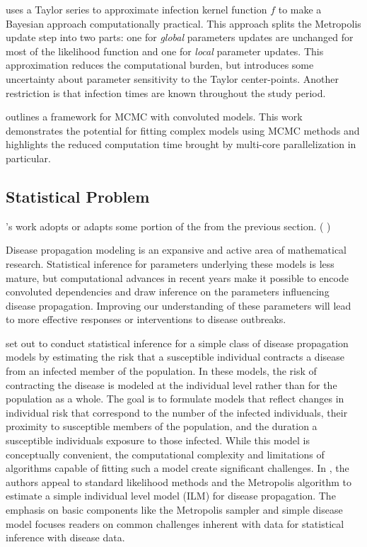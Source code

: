 \documentclass{uwstat572}
\newcommand{\vmcomment}[1]{({\color{blue}{VM's comment:}} \textbf{\color{blue}{#1}})}
\begin{document}
\cite{Deardon} uses a Taylor series to approximate infection kernel function $f$ to make a Bayesian approach computationally practical. 
This approach splits the Metropolis update step into two parts: one for \textit{global} parameters updates are unchanged for most of the likelihood function and one for \textit{local} parameter updates. 
This approximation reduces the computational burden, but introduces some uncertainty about parameter sensitivity to the Taylor center-points. 
Another restriction is that infection times are known throughout the study period. 

\cite{Jewell} outlines a framework for MCMC with convoluted models.
This work demonstrates the potential for fitting complex models using MCMC methods and highlights the reduced computation time brought by multi-core parallelization in particular.  

\subsection{Statistical Problem}

\cite{Brown}'s work adopts or adapts some portion of the from the previous section. 
\vmcomment{This a very vague sentence}

Disease propagation modeling is an expansive and active area of mathematical research.
Statistical inference for parameters underlying these models is less mature, but computational advances in recent years make it possible to encode convoluted dependencies and draw inference on the parameters influencing disease propagation. 
Improving our understanding of these parameters will lead to more effective responses or interventions to disease outbreaks. 

\citet{Brown} set out to conduct statistical inference for a simple class of disease propagation models by estimating the risk that a susceptible individual contracts a disease from an infected member of the population. 
In these models, the risk of contracting the disease is modeled at the individual level rather than for the population as a whole. 
The goal is to formulate models that reflect changes in individual risk that correspond to the number of the infected individuals, their proximity to susceptible members of the population, and the duration a susceptible individuals  exposure to those infected. 
While this model is conceptually convenient, the computational complexity and limitations of algorithms capable of fitting such a model create significant challenges.
In \citet{Brown}, the authors appeal to standard likelihood methods and the Metropolis algorithm to estimate a simple individual level model (ILM) for disease propagation.
The emphasis on basic components like the Metropolis sampler and simple disease model focuses readers on common challenges inherent with data for statistical inference with disease data. 
\end{document}
